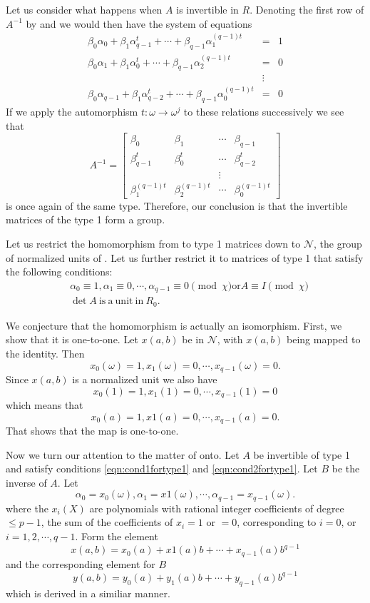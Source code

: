 \documentclass[11pt]{report}
\begin{document}
        Let us consider what happens when $A$ is invertible in $R$. Denoting 
the first row of $A^{-1}$
by  and we would then have the system of equations
\begin{align*}
\beta_0\alpha_0 + \beta_1\alpha^t_{q-1}+\cdots+\beta_{q-1}\alpha_1^{(q-1)t}&=&1\\
\beta_0\alpha_1 + \beta_1\alpha^t_0 + \cdots+\beta_{q-1}\alpha_2^{(q-1)t}&=&0\\
&\vdots&\\
\beta_0\alpha_{q-1} + \beta_1\alpha^t_{q-2} + \cdots+\beta_{q-1}\alpha_0^{(q-1)t}&=&0
\end{align*}
If we apply the automorphism $t:\omega\to\omega^j$ to these relations 
successively we see that
\[
A^{-1} = 
\begin{bmatrix}
\beta_0 &\beta_1 &\cdots&\beta_{q-1}\\
\beta_{q-1}^t &\beta_0^t &\cdots&\beta_{q-2}^t\\
&&\vdots& \\
 \beta_1^{(q-1)t} &\beta_2^{(q-1)t} &\cdots&\beta_0^{(q-1)t}
\end{bmatrix}
\]
is once again of the same type. Therefore, our conclusion is that 
the invertible matrices of the
type 1 form a group.


        Let us restrict the homomorphism from \intG{} to type 1 matrices down 
to $\mathscr{N}$, the group
of normalized units of \intG{}. Let us further restrict it to 
matrices of type 1 that satisfy the
following conditions:
\begin{align}
&\alpha_0\equiv1,\alpha_1\equiv0,\cdots,\alpha_{q-1}\equiv0 \pmod{\chi}\mathrm{ or }
A\equiv I \pmod{\chi}\label{eqn:cond1fortype1}\\
&\det{A}\mathrm{\ is\ a\ unit\ in\ }R_0\label{eqn:cond2fortype1}.
\end{align}

We conjecture that the homomorphism is actually an isomorphism. 
First, we show
that it is one-to-one. Let $x(a,b)$ be in $\mathscr{N}$, with $x(a,b)$ being 
mapped to the identity. 
Then\[x_0(\omega)=1, x_1(\omega)=0,\cdots,x_{q-1}(\omega)=0.\]
Since $x(a,b)$ is a normalized unit we also have
\[x_0(1)=1, x_1(1)=0,\cdots,x_{q-1}(1)=0\]
which means that\[
x_0(a)=1, x1(a)=0,\cdots,x_{q-1}(a)=0.\]
That shows that the map is one-to-one.

Now we turn our attention to the matter of onto. Let $A$ be 
invertible of type 1 and
satisfy conditions \ref{eqn:cond1fortype1} and 
\ref{eqn:cond2fortype1}. Let $B$ be the inverse of $A$. Let
\[\alpha_0 = x_0(\omega), \alpha_1 = x1(\omega),\cdots,
\alpha_{q-1} = x_{q-1}(\omega).\]
where the $x_i(X)$ are polynomials with rational integer 
coefficients of degree $\le{}p-1$, the sum of
the coefficients of $x_i=1$ or $=0$, corresponding to $i=0$, or 
$i=1,2,\cdots,q-1$. Form the element
\[        x(a,b) = x_0(a) + x1(a)b + \cdots + x_{q-1}(a)b^{q-1}\]
and the corresponding element for $B$
\[     y(a,b) =   y_0(a) + y_1(a)b +\cdots+ y_{q-1}(a)b^{q-1}\]
which is        derived in a similiar manner.
\end{document}
